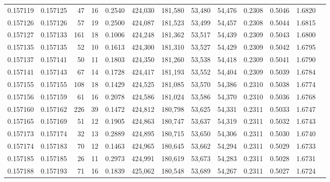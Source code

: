 \begin{tabular}{rrrrrrrrrrrrr}
0.157119 & 0.157125 &    47 &  16 &                                     0.2540 & 424,030 & 181,580 &  53,480 &  54,476 & 0.2308 & 0.5046 & 1.6820 \\
0.157126 & 0.157126 &    57 &  19 &                                     0.2500 & 424,087 & 181,523 &  53,499 &  54,457 & 0.2308 & 0.5044 & 1.6815 \\
0.157127 & 0.157133 &   161 &  18 &                                     0.1006 & 424,248 & 181,362 &  53,517 &  54,439 & 0.2309 & 0.5043 & 1.6800 \\
0.157135 & 0.157135 &    52 &  10 &                                     0.1613 & 424,300 & 181,310 &  53,527 &  54,429 & 0.2309 & 0.5042 & 1.6795 \\
0.157137 & 0.157141 &    50 &  11 &                                     0.1803 & 424,350 & 181,260 &  53,538 &  54,418 & 0.2309 & 0.5041 & 1.6790 \\
0.157141 & 0.157143 &    67 &  14 &                                     0.1728 & 424,417 & 181,193 &  53,552 &  54,404 & 0.2309 & 0.5039 & 1.6784 \\
0.157155 & 0.157155 &   108 &  18 &                                     0.1429 & 424,525 & 181,085 &  53,570 &  54,386 & 0.2310 & 0.5038 & 1.6774 \\
0.157156 & 0.157159 &    61 &  16 &                                     0.2078 & 424,586 & 181,024 &  53,586 &  54,370 & 0.2310 & 0.5036 & 1.6768 \\
0.157160 & 0.157162 &   226 &  39 &                                     0.1472 & 424,812 & 180,798 &  53,625 &  54,331 & 0.2311 & 0.5033 & 1.6747 \\
0.157165 & 0.157169 &    51 &  12 &                                     0.1905 & 424,863 & 180,747 &  53,637 &  54,319 & 0.2311 & 0.5032 & 1.6743 \\
0.157173 & 0.157174 &    32 &  13 &                                     0.2889 & 424,895 & 180,715 &  53,650 &  54,306 & 0.2311 & 0.5030 & 1.6740 \\
0.157174 & 0.157183 &    70 &  12 &                                     0.1463 & 424,965 & 180,645 &  53,662 &  54,294 & 0.2311 & 0.5029 & 1.6733 \\
0.157185 & 0.157185 &    26 &  11 &                                     0.2973 & 424,991 & 180,619 &  53,673 &  54,283 & 0.2311 & 0.5028 & 1.6731 \\
0.157188 & 0.157193 &    71 &  16 &                                     0.1839 & 425,062 & 180,548 &  53,689 &  54,267 & 0.2311 & 0.5027 & 1.6724 \\

\end{tabular}
